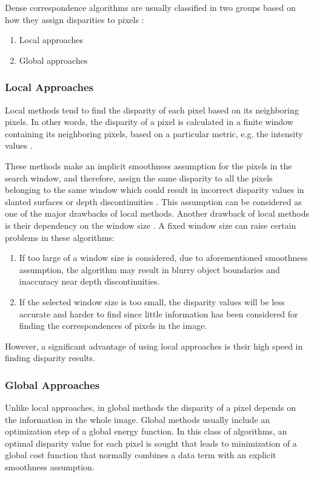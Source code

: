 Dense correspondence algorithms are usually classified in two groups based on how they assign
disparities to pixels \cite{sze11}:
\begin{enumerate}
\item Local approaches
\item Global approaches
\end{enumerate}

\subsubsection{Local Approaches} 

Local methods tend to find the disparity of each pixel based on its neighboring pixels. In
other words, the disparity of a pixel is calculated in a finite window containing its neighboring pixels, based on a particular metric, e.g. the intensity values \cite{sch02}.

These methods make an implicit smoothness assumption for the pixels in the search
window, and therefore, assign the same disparity to all the pixels belonging to the same window which could result in incorrect disparity values in slanted surfaces or
depth discontinuities \cite{hirsch02}. This assumption can be considered as one of the major drawbacks of local methods.
Another drawback of local methods is their dependency on the window size \cite{sch02}. A fixed window size can raise certain problems in these algorithms:
\begin{enumerate}
\item If too large of a window size is considered, due to aforementioned smoothness assumption, the algorithm may result in blurry object boundaries and inaccuracy near depth discontinuities.
\item If the selected window size is too small, the disparity values will be less accurate and harder to find since little information has been considered for 
finding the correspondences of pixels in the image.
\end{enumerate}

However, a significant advantage of using local approaches is their high speed in finding disparity results.\newline

\subsubsection{Global Approaches}
Unlike local approaches, in global methods the disparity of a pixel depends on the information in
the whole image. Global methods usually include an optimization step of a global energy
function\cite{roy98,bobi99,boyk01,hong10}. In this class of algorithms, an optimal disparity value for each pixel is sought that leads to minimization of a global cost
function that normally combines a data term with an explicit smoothness assumption.

